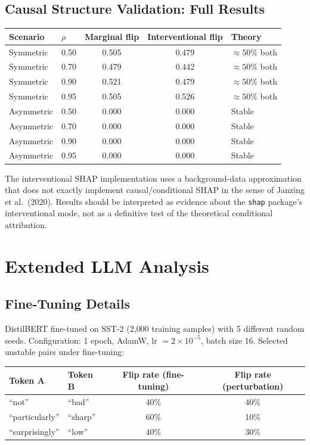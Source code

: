 \documentclass{article}
\begin{document}
\subsection{Causal Structure Validation: Full Results}

\begin{center}
\small
\begin{tabular}{@{}llccl@{}}
\toprule
Scenario & $\rho$ & Marginal flip & Interventional flip & Theory \\
\midrule
Symmetric & 0.50 & 0.505 & 0.479 & ${\approx}50\%$ both \\
Symmetric & 0.70 & 0.479 & 0.442 & ${\approx}50\%$ both \\
Symmetric & 0.90 & 0.521 & 0.479 & ${\approx}50\%$ both \\
Symmetric & 0.95 & 0.505 & 0.526 & ${\approx}50\%$ both \\
\midrule
Asymmetric & 0.50 & 0.000 & 0.000 & Stable \\
Asymmetric & 0.70 & 0.000 & 0.000 & Stable \\
Asymmetric & 0.90 & 0.000 & 0.000 & Stable \\
Asymmetric & 0.95 & 0.000 & 0.000 & Stable \\
\bottomrule
\end{tabular}
\end{center}

The interventional SHAP implementation uses a background-data approximation that does not exactly implement causal/conditional SHAP in the sense of Janzing et al.\ (2020). Results should be interpreted as evidence about the \texttt{shap} package's interventional mode, not as a definitive test of the theoretical conditional attribution.

\section{Extended LLM Analysis}

\subsection{Fine-Tuning Details}

DistilBERT fine-tuned on SST-2 (2{,}000 training samples) with 5 different random seeds. Configuration: 1 epoch, AdamW, lr $= 2 \times 10^{-5}$, batch size 16. Selected unstable pairs under fine-tuning:

\begin{center}
\small
\begin{tabular}{@{}llcc@{}}
\toprule
Token A & Token B & Flip rate (fine-tuning) & Flip rate (perturbation) \\
\midrule
``not'' & ``bad'' & 40\% & 40\% \\
``particularly'' & ``sharp'' & 60\% & 10\% \\
``surprisingly'' & ``low'' & 40\% & 30\% \\
\bottomrule
\end{tabular}
\end{center}
\end{document}
